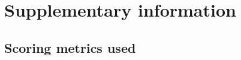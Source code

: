 \documentclass[
]{article}
\begin{document}
\clearpage

\setcounter{table}{0}  \renewcommand{\thetable}{S\arabic{table}} \setcounter{figure}{0} \renewcommand{\thefigure}{S\arabic{figure}}

\hypertarget{appendix-supplementary-information}{%
\appendix}


\hypertarget{supplementary-information}{%
\section{Supplementary information}\label{supplementary-information}}

\hypertarget{scoring-metrics-used}{%
\subsection{Scoring metrics used}\label{scoring-metrics-used}}
\end{document}
